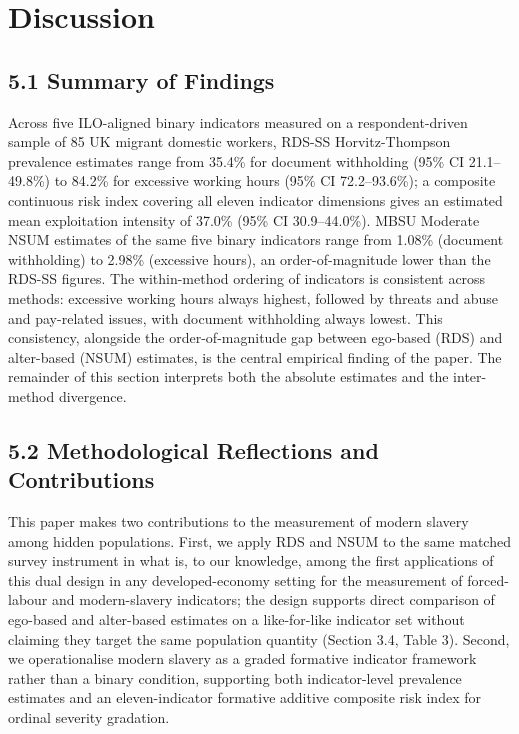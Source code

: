 \documentclass[
  12pt,
  letterpaper,
  DIV=11,
  numbers=noendperiod]{scrartcl}
\begin{document}
\section{Discussion}\label{discussion}

\subsection{5.1 Summary of Findings}\label{summary-of-findings}

Across five ILO-aligned binary indicators measured on a
respondent-driven sample of 85 UK migrant domestic workers, RDS-SS
Horvitz-Thompson prevalence estimates range from 35.4\% for document
withholding (95\% CI 21.1--49.8\%) to 84.2\% for excessive working hours
(95\% CI 72.2--93.6\%); a composite continuous risk index covering all
eleven indicator dimensions gives an estimated mean exploitation
intensity of 37.0\% (95\% CI 30.9--44.0\%). MBSU Moderate NSUM estimates
of the same five binary indicators range from 1.08\% (document
withholding) to 2.98\% (excessive hours), an order-of-magnitude lower
than the RDS-SS figures. The within-method ordering of indicators is
consistent across methods: excessive working hours always highest,
followed by threats and abuse and pay-related issues, with document
withholding always lowest. This consistency, alongside the
order-of-magnitude gap between ego-based (RDS) and alter-based (NSUM)
estimates, is the central empirical finding of the paper. The remainder
of this section interprets both the absolute estimates and the
inter-method divergence.

\subsection{5.2 Methodological Reflections and
Contributions}\label{methodological-reflections-and-contributions}

This paper makes two contributions to the measurement of modern slavery
among hidden populations. First, we apply RDS and NSUM to the same
matched survey instrument in what is, to our knowledge, among the first
applications of this dual design in any developed-economy setting for
the measurement of forced-labour and modern-slavery indicators; the
design supports direct comparison of ego-based and alter-based estimates
on a like-for-like indicator set without claiming they target the same
population quantity (Section 3.4, Table 3). Second, we operationalise
modern slavery as a graded formative indicator framework rather than a
binary condition, supporting both indicator-level prevalence estimates
and an eleven-indicator formative additive composite risk index for
ordinal severity gradation.
\end{document}
